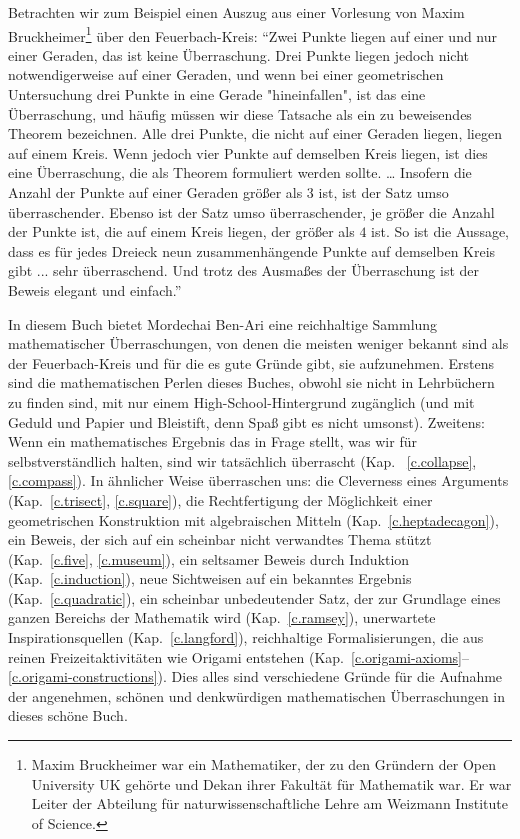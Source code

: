 Betrachten wir zum Beispiel einen Auszug aus einer Vorlesung von Maxim Bruckheimer\footnote{Maxim Bruckheimer war ein Mathematiker, der zu den Gründern der Open University UK gehörte und Dekan ihrer Fakultät für Mathematik war. Er war Leiter der Abteilung für naturwissenschaftliche Lehre am Weizmann Institute of Science.} über den Feuerbach-Kreis: ``Zwei Punkte liegen auf einer und nur einer Geraden, das ist keine Überraschung. Drei Punkte liegen jedoch nicht notwendigerweise auf einer Geraden, und wenn bei einer geometrischen Untersuchung drei Punkte in eine Gerade "hineinfallen", ist das eine Überraschung, und häufig müssen wir diese Tatsache als ein zu beweisendes Theorem bezeichnen. Alle drei Punkte, die nicht auf einer Geraden liegen, liegen auf einem Kreis. Wenn jedoch vier Punkte auf demselben Kreis liegen, ist dies eine Überraschung, die als Theorem formuliert werden sollte. \ldots{} Insofern die Anzahl der Punkte auf einer Geraden größer als $3$ ist, ist der Satz umso überraschender. Ebenso ist der Satz umso überraschender, je größer die Anzahl der Punkte ist, die auf einem Kreis liegen, der größer als $4$ ist. So ist die Aussage, dass es für jedes Dreieck neun zusammenhängende Punkte auf demselben Kreis gibt ... sehr überraschend. Und trotz des Ausmaßes der Überraschung ist der Beweis elegant und einfach.''

In diesem Buch bietet Mordechai Ben-Ari eine reichhaltige Sammlung mathematischer Überraschungen, von denen die meisten weniger bekannt sind als der Feuerbach-Kreis und für die es gute Gründe gibt, sie aufzunehmen. Erstens sind die mathematischen Perlen dieses Buches, obwohl sie nicht in Lehrbüchern zu finden sind, mit nur einem High-School-Hintergrund zugänglich (und mit Geduld und Papier und Bleistift, denn Spaß gibt es nicht umsonst). Zweitens: Wenn ein mathematisches Ergebnis das in Frage stellt, was wir für selbstverständlich halten, sind wir tatsächlich überrascht (Kap. ~\ref{c.collapse}, \ref{c.compass}). In ähnlicher Weise überraschen uns: die Cleverness eines Arguments (Kap.~\ref{c.trisect}, \ref{c.square}), die Rechtfertigung der Möglichkeit einer geometrischen Konstruktion mit algebraischen Mitteln (Kap.~\ref{c.heptadecagon}), ein Beweis, der sich auf ein scheinbar nicht verwandtes Thema stützt (Kap.~\ref{c.five}, \ref{c.museum}), ein seltsamer Beweis durch Induktion (Kap.~\ref{c.induction}), neue Sichtweisen auf ein bekanntes Ergebnis (Kap.~\ref{c.quadratic}), ein scheinbar unbedeutender Satz, der zur Grundlage eines ganzen Bereichs der Mathematik wird (Kap.~\ref{c.ramsey}), unerwartete Inspirationsquellen (Kap.~\ref{c.langford}), reichhaltige Formalisierungen, die aus reinen Freizeitaktivitäten wie Origami entstehen (Kap.~\ref{c.origami-axioms}--\ref{c.origami-constructions}). Dies alles sind verschiedene Gründe für die Aufnahme der angenehmen, schönen und denkwürdigen mathematischen Überraschungen in dieses schöne Buch.
   
